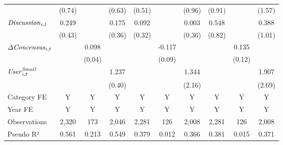 {\begin{tabular}{l*{9}{c}}
                    &      (0.74)         &                     &      (0.63)         &      (0.51)         &                     &      (0.96)         &      (0.91)         &                     &      (1.57)         \\
${\it Discussion}_{i,t}$&       0.249         &                     &       0.175         &       0.092         &                     &       0.003         &       0.548         &                     &       0.388         \\
                    &      (0.43)         &                     &      (0.36)         &      (0.32)         &                     &      (0.36)         &      (0.82)         &                     &      (1.01)         \\
${\it \Delta Concensus}_{i,t}$&                     &       0.098\sym{**} &                     &                     &      -0.117         &                     &                     &       0.135         &                     \\
                    &                     &      (0.04)         &                     &                     &      (0.09)         &                     &                     &      (0.12)         &                     \\
${\it User}_{i,t}^{\it Small}$&                     &                     &       1.237\sym{***}&                     &                     &       1.344         &                     &                     &       1.907         \\
                    &                     &                     &      (0.40)         &                     &                     &      (2.16)         &                     &                     &      (2.69)         \\
\midrule
Category FE         &           Y         &           Y         &           Y         &           Y         &           Y         &           Y         &           Y         &           Y         &           Y         \\
Year FE             &           Y         &           Y         &           Y         &           Y         &           Y         &           Y         &           Y         &           Y         &           Y         \\
Observations        &       2,320         &         173         &       2,046         &       2,281         &         126         &       2,008         &       2,281         &         126         &       2,008         \\
Pseudo R²           &       0.561         &       0.213         &       0.549         &       0.379         &       0.012         &       0.366         &       0.381         &       0.015         &       0.371         \\
\bottomrule
\end{tabular}
}
